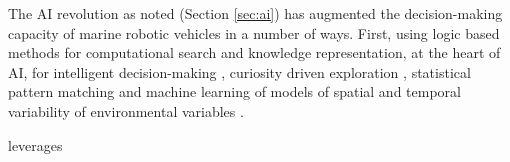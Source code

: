 The AI revolution as noted (Section \ref{sec:ai}) has augmented the
decision-making capacity of marine robotic vehicles in a number of
ways. First, using logic based methods for computational search and
knowledge representation, at the heart of AI, for intelligent
decision-making \cite{ryan10,fossum18,fossum18b}, curiosity driven
exploration \cite{girdhar14}, statistical pattern matching and machine
learning of models of spatial and temporal variability of
environmental variables \cite{fossum19b}.


\proj leverages 


\begin{enumerate} 
\end{enumerate}

